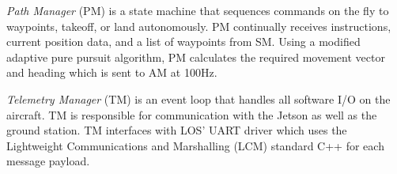 \textit{Path Manager} (PM) is a state machine that sequences commands on the
fly to waypoints, takeoff, or land autonomously. PM continually receives
instructions, current position data, and a list of waypoints from SM. Using a
modified adaptive pure pursuit algorithm, PM calculates the required movement
vector and heading which is sent to AM at 100Hz.


\textit{Telemetry Manager} (TM) is an event loop that handles all software I/O
on the aircraft. TM is responsible for communication with the Jetson as well as
the ground station. TM interfaces with LOS' UART driver which uses the
Lightweight Communications and Marshalling (LCM) standard C++ for each message
payload.
